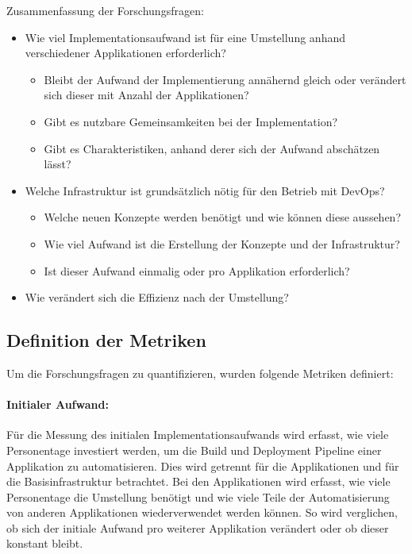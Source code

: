 Zusammenfassung der Forschungsfragen:
\begin{itemize}
	\item Wie viel Implementationsaufwand ist für eine Umstellung anhand verschiedener Applikationen erforderlich?
	\begin{itemize}
		\item Bleibt der Aufwand der Implementierung annähernd gleich oder verändert sich dieser mit Anzahl der Applikationen?
		\item Gibt es nutzbare Gemeinsamkeiten bei der Implementation?
		\item Gibt es Charakteristiken, anhand derer sich der Aufwand abschätzen lässt?
	\end{itemize}
	\item Welche Infrastruktur ist grundsätzlich nötig für den Betrieb mit DevOps?
	\begin{itemize}
		\item Welche neuen Konzepte werden benötigt und wie können diese aussehen?
		\item Wie viel Aufwand ist die Erstellung der Konzepte und der Infrastruktur?
		\item Ist dieser Aufwand einmalig oder pro Applikation erforderlich?	
	\end{itemize}
	\item Wie verändert sich die Effizienz nach der Umstellung?
\end{itemize}

\subsection{Definition der Metriken}
\label{sec:metriken}
Um die Forschungsfragen zu quantifizieren, wurden folgende Metriken definiert: 

\paragraph{Initialer Aufwand:} Für die Messung des initialen Implementationsaufwands wird erfasst, wie viele Personentage investiert werden, um die Build und Deployment Pipeline einer Applikation zu automatisieren. Dies wird getrennt für die Applikationen und für die Basisinfrastruktur betrachtet. Bei den Applikationen wird erfasst, wie viele Personentage die Umstellung benötigt und wie viele Teile der Automatisierung von anderen Applikationen wiederverwendet werden können. So wird verglichen, ob sich der initiale Aufwand pro weiterer Applikation verändert oder ob dieser konstant bleibt. 

